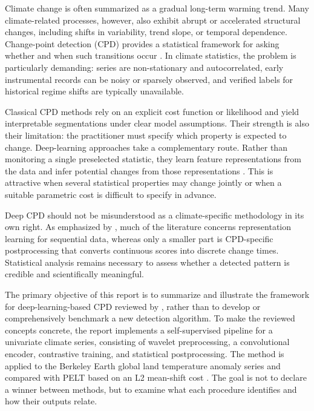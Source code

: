 \documentclass[
]{krantz}
\begin{document}
Climate change is often summarized as a gradual long-term warming trend. Many climate-related processes, however, also exhibit abrupt or accelerated structural changes, including shifts in variability, trend slope, or temporal dependence. Change-point detection (CPD) provides a statistical framework for asking whether and when such transitions occur \citep{killick2012, truong2020}. In climate statistics, the problem is particularly demanding: series are non-stationary and autocorrelated, early instrumental records can be noisy or sparsely observed, and verified labels for historical regime shifts are typically unavailable.

Classical CPD methods rely on an explicit cost function or likelihood and yield interpretable segmentations under clear model assumptions. Their strength is also their limitation: the practitioner must specify which property is expected to change. Deep-learning approaches take a complementary route. Rather than monitoring a single preselected statistic, they learn feature representations from the data and infer potential changes from those representations \citep{xu2025}. This is attractive when several statistical properties may change jointly or when a suitable parametric cost is difficult to specify in advance.

Deep CPD should not be misunderstood as a climate-specific methodology in its own right. As emphasized by \citep{xu2025}, much of the literature concerns representation learning for sequential data, whereas only a smaller part is CPD-specific postprocessing that converts continuous scores into discrete change times. Statistical analysis remains necessary to assess whether a detected pattern is credible and scientifically meaningful.

The primary objective of this report is to summarize and illustrate the framework for deep-learning-based CPD reviewed by \citep{xu2025}, rather than to develop or comprehensively benchmark a new detection algorithm. To make the reviewed concepts concrete, the report implements a self-supervised pipeline for a univariate climate series, consisting of wavelet preprocessing, a convolutional encoder, contrastive training, and statistical postprocessing. The method is applied to the Berkeley Earth global land temperature anomaly series \citep{berkeleyearth2024} and compared with PELT based on an L2 mean-shift cost \citep{killick2012}. The goal is not to declare a winner between methods, but to examine what each procedure identifies and how their outputs relate.
\end{document}

